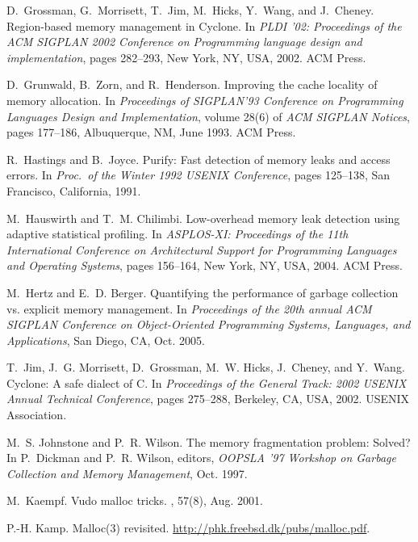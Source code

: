 \documentclass{sig-alternate}
\begin{document}
\begin{thebibliography}{10}
D.~Grossman, G.~Morrisett, T.~Jim, M.~Hicks, Y.~Wang, and J.~Cheney.
\newblock Region-based memory management in {Cyclone}.
\newblock In {\em PLDI '02: Proceedings of the ACM SIGPLAN 2002 Conference on
  Programming language design and implementation}, pages 282--293, New York,
  NY, USA, 2002. ACM Press.

D.~Grunwald, B.~Zorn, and R.~Henderson.
\newblock Improving the cache locality of memory allocation.
\newblock In {\em Proceedings of {SIGPLAN'93} Conference on Programming
  Languages Design and Implementation}, volume 28(6) of {\em ACM SIGPLAN
  Notices}, pages 177--186, Albuquerque, NM, June 1993. ACM Press.

R.~Hastings and B.~Joyce.
\newblock Purify: Fast detection of memory leaks and access errors.
\newblock In {\em Proc.\ of the Winter 1992 USENIX Conference}, pages 125--138,
  San Francisco, California, 1991.

M.~Hauswirth and T.~M. Chilimbi.
\newblock Low-overhead memory leak detection using adaptive statistical
  profiling.
\newblock In {\em {ASPLOS-XI: Proceedings of the 11th International Conference
  on Architectural Support for Programming Languages and Operating Systems}},
  pages 156--164, New York, NY, USA, 2004. ACM Press.

M.~Hertz and E.~D. Berger.
\newblock Quantifying the performance of garbage collection vs. explicit memory
  management.
\newblock In {\em Proceedings of the 20th annual {ACM} {SIGPLAN} Conference on
  Object-Oriented Programming Systems, Languages, and Applications}, San Diego,
  CA, Oct. 2005.

T.~Jim, J.~G. Morrisett, D.~Grossman, M.~W. Hicks, J.~Cheney, and Y.~Wang.
\newblock Cyclone: A safe dialect of {C}.
\newblock In {\em Proceedings of the General Track: 2002 USENIX Annual
  Technical Conference}, pages 275--288, Berkeley, CA, USA, 2002. USENIX
  Association.

M.~S. Johnstone and P.~R. Wilson.
\newblock The memory fragmentation problem: Solved?
\newblock In P.~Dickman and P.~R. Wilson, editors, {\em {OOPSLA} '97 Workshop
  on Garbage Collection and Memory Management}, Oct. 1997.

M.~Kaempf.
\newblock Vudo malloc tricks.
, 57(8), Aug. 2001.

P.-H. Kamp.
\newblock Malloc(3) revisited.
\newblock \url{http://phk.freebsd.dk/pubs/malloc.pdf}.


\end{thebibliography}
\end{document}
